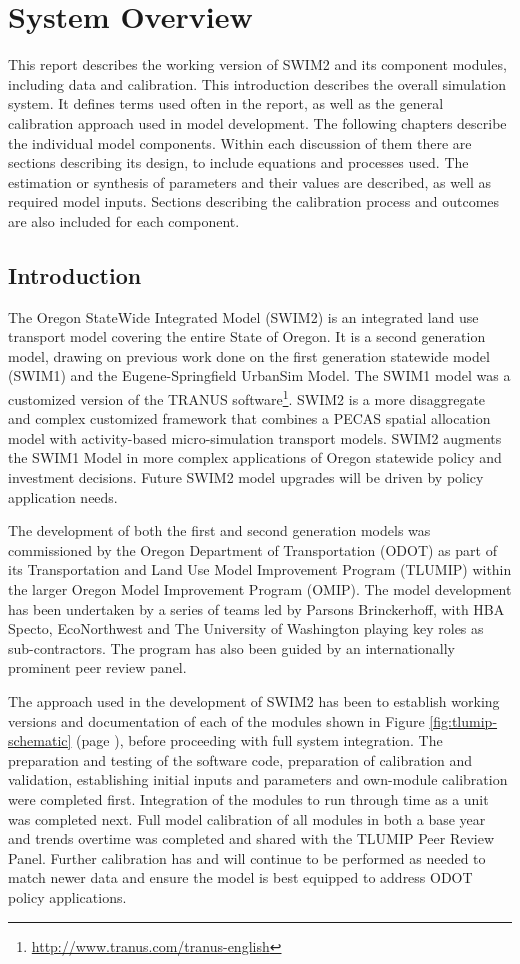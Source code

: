 \chapter{System Overview}
This report describes the working version of SWIM2 and its component modules, including data and calibration. This introduction describes the overall simulation system. It defines terms used often in the report, as well as the general calibration approach used in model development. The following chapters describe the individual model components. Within each discussion of them there are sections describing its design, to include equations and processes used. The estimation or synthesis of parameters and their values are described, as well as required model inputs. Sections describing the calibration process and outcomes are also included for each component.  

\section{Introduction}
The Oregon StateWide Integrated Model (SWIM2) is an integrated land use transport model covering the entire State of Oregon. It is a second generation model, drawing on previous work done on the first generation statewide model (SWIM1) and the Eugene-Springfield UrbanSim Model. The SWIM1 model \citep{parsons99} was a customized version of the TRANUS software\footnote{\url{http://www.tranus.com/tranus-english}}. SWIM2 is a more disaggregate and complex customized framework that combines a PECAS spatial allocation model with activity-based micro-simulation transport models. SWIM2 augments the SWIM1 Model in more complex applications of Oregon statewide policy and investment decisions. Future SWIM2 model upgrades will be driven by policy application needs.

The development of both the first and second generation models was commissioned by the Oregon Department of Transportation (ODOT) as part of its Transportation and Land Use Model Improvement Program (TLUMIP) within the larger Oregon Model Improvement Program (OMIP). The model development has been undertaken by a series of teams led by Parsons Brinckerhoff, with HBA Specto, EcoNorthwest and The University of Washington playing key roles as sub-contractors. The program has also been guided by an internationally prominent peer review panel.

The approach used in the development of SWIM2 has been to establish working versions and documentation of each of the modules shown in Figure \ref{fig:tlumip-schematic} (page \pageref{fig:tlumip-schematic}), before proceeding with full system integration. The preparation and testing of the software code, preparation of calibration and validation, establishing initial inputs and parameters and own-module calibration were completed first. Integration of the modules to run through time as a unit was completed next. Full model calibration of all modules in both a base year and trends overtime was completed and shared with the TLUMIP Peer Review Panel. Further calibration has and will continue to be performed as needed to match newer data and ensure the model is best equipped to address ODOT policy applications. 

